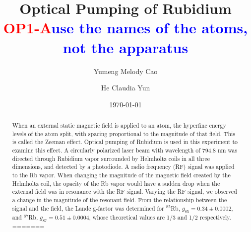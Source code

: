 \documentclass[prb,preprint]{revtex4-1}
\begin{document}
\title{Optical Pumping of Rubidium \textcolor{red}{OP1-A}\textcolor{blue}{use the names of the atoms, not the apparatus}}

\author{Yumeng Melody Cao}
\author{He Claudia Yun}


\date{\today}


\begin{abstract}


When an external static magnetic field is applied to an atom, the hyperfine energy levels of the atom split, with spacing proportional to the magnitude of that field. This is called the Zeeman effect. Optical pumping of Rubidium is used in this experiment to examine this effect. A circularly polarized laser beam with wavelength of 794.8 nm was directed through Rubidium vapor surrounded by Helmholtz coils in all three dimensions, and detected by a photodiode. A radio frequency (RF) signal was applied to the Rb vapor. When changing the magnitude of the magnetic field created by the Helmholtz coil, the opacity of the Rb vapor would have a sudden drop when the external field was in resonance with the RF signal. Varying the RF signal, we observed a change in the magnitude of the resonant field. From the relationship between the signal and the field, the Lande g-factor was determined for $^8$$^5$Rb, $g_{85}=0.34\pm0.0002$, and $^8$$^7$Rb, $g_{87}=0.51\pm0.0004$, whose theoretical values are 1/3 and 1/2 respectively. \\
=======


\end{abstract}
\end{document}
